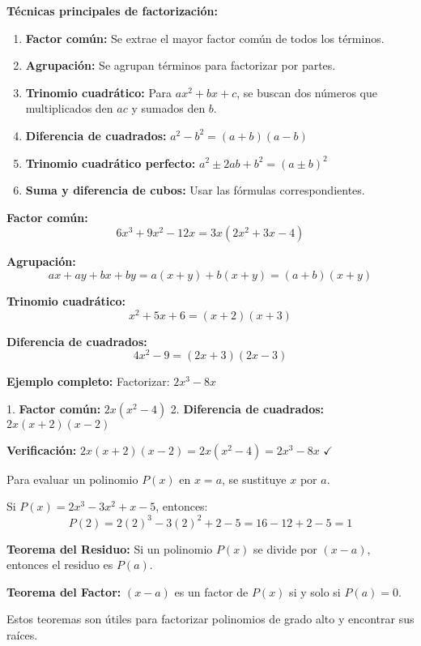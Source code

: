 \textbf{Técnicas principales de factorización:}

\begin{enumerate}
\item \textbf{Factor común:} Se extrae el mayor factor común de todos los términos.
\item \textbf{Agrupación:} Se agrupan términos para factorizar por partes.
\item \textbf{Trinomio cuadrático:} Para $ax^2 + bx + c$, se buscan dos números que multiplicados den $ac$ y sumados den $b$.
\item \textbf{Diferencia de cuadrados:} $a^2 - b^2 = (a + b)(a - b)$
\item \textbf{Trinomio cuadrático perfecto:} $a^2 \pm 2ab + b^2 = (a \pm b)^2$
\item \textbf{Suma y diferencia de cubos:} Usar las fórmulas correspondientes.
\end{enumerate}

\begin{example}
\textbf{Factor común:}
$$6x^3 + 9x^2 - 12x = 3x(2x^2 + 3x - 4)$$

\textbf{Agrupación:}
$$ax + ay + bx + by = a(x + y) + b(x + y) = (a + b)(x + y)$$

\textbf{Trinomio cuadrático:}
$$x^2 + 5x + 6 = (x + 2)(x + 3)$$

\textbf{Diferencia de cuadrados:}
$$4x^2 - 9 = (2x + 3)(2x - 3)$$

\textbf{Ejemplo completo:}
Factorizar: $2x^3 - 8x$

1. \textbf{Factor común:} $2x(x^2 - 4)$
2. \textbf{Diferencia de cuadrados:} $2x(x + 2)(x - 2)$

\textbf{Verificación:} $2x(x + 2)(x - 2) = 2x(x^2 - 4) = 2x^3 - 8x$ $\checkmark$
\end{example}


\begin{definition}
Para evaluar un polinomio $P(x)$ en $x = a$, se sustituye $x$ por $a$.
\end{definition}

\begin{example}
Si $P(x) = 2x^3 - 3x^2 + x - 5$, entonces:
$$P(2) = 2(2)^3 - 3(2)^2 + 2 - 5 = 16 - 12 + 2 - 5 = 1$$
\end{example}

\begin{theorem}
\textbf{Teorema del Residuo:} Si un polinomio $P(x)$ se divide por $(x - a)$, entonces el residuo es $P(a)$.

\noindent \textbf{Teorema del Factor:} $(x - a)$ es un factor de $P(x)$ si y solo si $P(a) = 0$.
\end{theorem}

Estos teoremas son útiles para factorizar polinomios de grado alto y encontrar sus raíces.